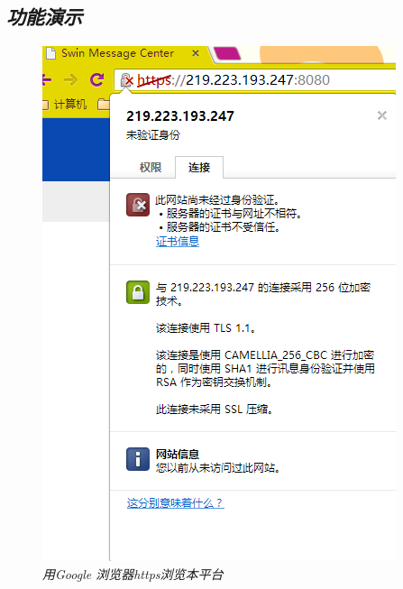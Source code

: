 \documentclass[a4paper]{ctexart}
\begin{document}
    \subsection{\small \sl 功能演示}
    \begin{figure}[]
        \centering
        \includegraphics{zhengshu1.png}
        \caption{\small \sl 用Google 浏览器https浏览本平台}
        \label{fig:website-zhenshu1}
    \end{figure}
\end{document}
